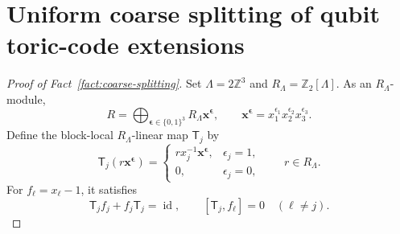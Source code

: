 \documentclass[aps,prx,english,superscriptaddress,twocolumn,tightenlines,showpacs,longbibliography,floatfix,amsfonts]{revtex4-2}
\theoremstyle{remark}
\theoremstyle{definition}
\begin{document}
\section{Uniform coarse splitting of qubit toric-code extensions}
\label{app:coarse-splitting}

\begin{proof}[Proof of Fact~\ref{fact:coarse-splitting}]
	Set \(\Lambda=2\mathbb Z^3\) and
	\(R_\Lambda=\mathbb Z_2[\Lambda]\). As an \(R_\Lambda\)-module,
	\begin{equation}
		R=\bigoplus_{\boldsymbol\epsilon\in\{0,1\}^3}
		R_\Lambda\mathbf x^{\boldsymbol\epsilon},
		\qquad
		\mathbf x^{\boldsymbol\epsilon}
		=x_1^{\epsilon_1}x_2^{\epsilon_2}x_3^{\epsilon_3}.
	\end{equation}
	Define the block-local \(R_\Lambda\)-linear map
	\(\mathsf T_j\) by
	\begin{equation}
		\mathsf T_j(r\mathbf x^{\boldsymbol\epsilon})
		=
		\begin{cases}
			r x_j^{-1}\mathbf x^{\boldsymbol\epsilon},&\epsilon_j=1,\\
			0,&\epsilon_j=0,
		\end{cases}
		\qquad r\in R_\Lambda.
	\end{equation}
	For \(f_\ell=x_\ell-1\), it satisfies
	\begin{equation}
		\mathsf T_jf_j+f_j\mathsf T_j=\operatorname{id},
		\qquad
		[\mathsf T_j,f_\ell]=0\quad(\ell\neq j).
	\end{equation}


\end{proof}
\end{document}
